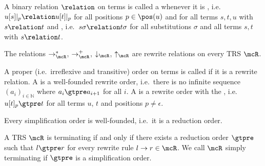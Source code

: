 %
\begin{definition}\label{def:closed-under}
A binary relation $\relation$ on terms is called a  whenever it is ,
i.e.~$u[s]|_p\relation u[t]|_p$ %
for all positions $p\in\pos(u)$ and
for all terms $s,t,u$ with $s\relation t$
and ,
i.e.~$s\sigma\relation t\sigma$ %
for all substitutions $\sigma$
and all terms $s,t$ with $s\relation t$.
\end{definition}
\begin{lemma}
The relations $\rightarrow^*_\mcR$,
$\rightarrow^+_\mcR$,
$\downarrow_\mcR$, $\uparrow_\mcR$ are rewrite relations on every TRS $\mcR$.
\end{lemma}
%
\begin{definition}
A proper (i.e.~irreflexive and transitive) order on terms is called  if it is a rewrite relation.
A  is a well-founded rewrite order,
i.e.~there is no infinite sequence
$(a_i)_{i\in\mathbb{N}}$
where $a_i\gtpre a_{i+1}$ for all $i$.
A  is a rewrite order with the ,
i.e.~$u[t]_p \gtpre t$ for all terms $u$, $t$ and positions $p\neq\epsilon$.
\end{definition}
\begin{lemma}
Every simplification order is well-founded, i.e.~it is a reduction order.
\end{lemma}
%
\begin{theorem}
A TRS $\mcR$ is terminating if and only if there exists a reduction order $\gtpre$
such that $l\gtpre r$ for every rewrite rule $l\rightarrow r\in\mcR$.
We call $\mcR$ simply terminating if $\gtpre$ is a simplification order.
\end{theorem}


